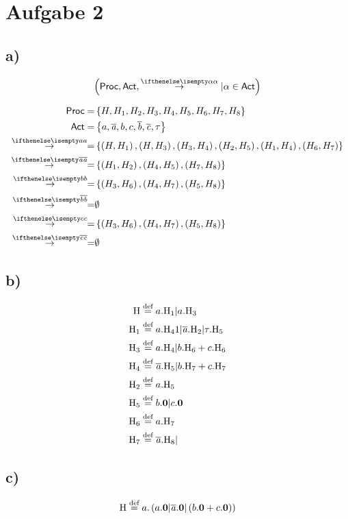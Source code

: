 \section*{Aufgabe 2}
\subsection*{a)}

\begin{equation*}
  \left( \Proc, \Act, \CCSTrans{\alpha} | \alpha \in \Act \right)
\end{equation*}

\begin{align*}
  \Proc =& \left\{ H, H_1, H_2,H_3,H_4,H_5,H_6,H_7,H_8 \right\} \\
  \Act =& \left\{ a, \Out{a}{}, b, c,  \Out{b}{},\Out{c}{},\tau  \right\} \\
  \CCSTrans{a} =& \left\{ \left( H, H_1 \right), \left( H, H_3 \right), \left( H_3, H_4 \right), \left( H_2, H_5 \right), \left( H_1, H_4 \right), \left( H_6, H_7 \right) \right\} \\
  \CCSTrans{\Out{a}{}} =& \left\{ \left( H_1, H_2 \right), \left( H_4, H_5 \right), \left( H_7, H_8 \right) \right\} \\
  \CCSTrans{b} =& \left\{ \left( H_3, H_6 \right), \left( H_4, H_7 \right), \left( H_5, H_8\right)  \right\} \\
  \CCSTrans{\Out{b}{}} =& \emptyset \\
  \CCSTrans{c} =& \left\{ \left( H_3, H_6 \right), \left( H_4, H_7 \right), \left( H_5, H_8\right)  \right\} \\
  \CCSTrans{\Out{c}{}} =& \emptyset
\end{align*}

\subsection*{b)}

\begin{align*}
  \Pro{H} &\CCSDef a.\Pro{H_1} | a.\Pro{H_3} \\
  \Pro{H_1} &\CCSDef a.\Pro{H_41} |\Out{a}{}.\Pro{H_2} | \tau . \Pro{H_5} \\
  \Pro{H_3} &\CCSDef a.\Pro{H_4} | b.\Pro{H_6} + c.\Pro{H_6} \\
  \Pro{H_4} &\CCSDef \Out{a}{}.\Pro{H_5} | b.\Pro{H_7} + c.\Pro{H_7}\\
  \Pro{H_2} &\CCSDef a.\Pro{H_5}  \\
  \Pro{H_5} &\CCSDef b.\nil | c.\nil \\
  \Pro{H_6} &\CCSDef a.\Pro{H_7} \\
  \Pro{H_7} &\CCSDef \Out{a}{}.\Pro{H_8}|  \\
\end{align*}

\subsection*{c)}

\begin{align*}
  \Pro{H} \CCSDef a.\left( a.\nil | \Out{a}{}.\nil | \left( b.\nil + c.\nil \right) \right)
\end{align*}
